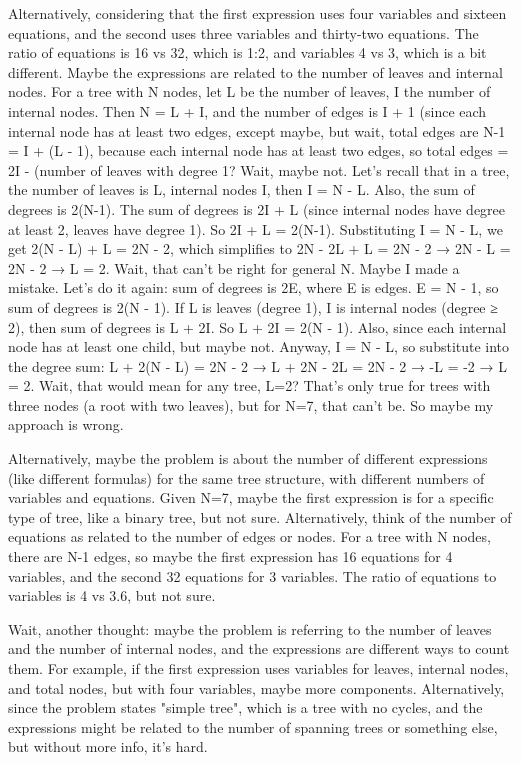Alternatively, considering that the first expression uses four variables and sixteen equations, and the second uses three variables and thirty-two equations. The ratio of equations is 16 vs 32, which is 1:2, and variables 4 vs 3, which is a bit different. Maybe the expressions are related to the number of leaves and internal nodes. For a tree with N nodes, let L be the number of leaves, I the number of internal nodes. Then N = L + I, and the number of edges is I + 1 (since each internal node has at least two edges, except maybe, but wait, total edges are N-1 = I + (L - 1), because each internal node has at least two edges, so total edges = 2I - (number of leaves with degree 1? Wait, maybe not. Let's recall that in a tree, the number of leaves is L, internal nodes I, then I = N - L. Also, the sum of degrees is 2(N-1). The sum of degrees is 2I + L (since internal nodes have degree at least 2, leaves have degree 1). So 2I + L = 2(N-1). Substituting I = N - L, we get 2(N - L) + L = 2N - 2, which simplifies to 2N - 2L + L = 2N - 2 → 2N - L = 2N - 2 → L = 2. Wait, that can't be right for general N. Maybe I made a mistake. Let's do it again: sum of degrees is 2E, where E is edges. E = N - 1, so sum of degrees is 2(N - 1). If L is leaves (degree 1), I is internal nodes (degree ≥ 2), then sum of degrees is L + 2I. So L + 2I = 2(N - 1). Also, since each internal node has at least one child, but maybe not. Anyway, I = N - L, so substitute into the degree sum: L + 2(N - L) = 2N - 2 → L + 2N - 2L = 2N - 2 → -L = -2 → L = 2. Wait, that would mean for any tree, L=2? That's only true for trees with three nodes (a root with two leaves), but for N=7, that can't be. So maybe my approach is wrong.

Alternatively, maybe the problem is about the number of different expressions (like different formulas) for the same tree structure, with different numbers of variables and equations. Given N=7, maybe the first expression is for a specific type of tree, like a binary tree, but not sure. Alternatively, think of the number of equations as related to the number of edges or nodes. For a tree with N nodes, there are N-1 edges, so maybe the first expression has 16 equations for 4 variables, and the second 32 equations for 3 variables. The ratio of equations to variables is 4 vs 3.6, but not sure.

Wait, another thought: maybe the problem is referring to the number of leaves and the number of internal nodes, and the expressions are different ways to count them. For example, if the first expression uses variables for leaves, internal nodes, and total nodes, but with four variables, maybe more components. Alternatively, since the problem states "simple tree", which is a tree with no cycles, and the expressions might be related to the number of spanning trees or something else, but without more info, it's hard.

